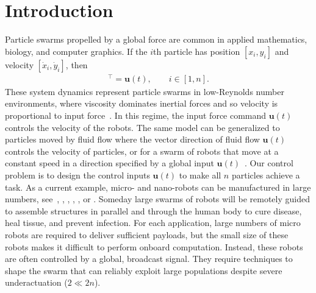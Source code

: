 \section{Introduction}\label{sec:Intro}
Particle swarms propelled by a global force are common in applied mathematics, biology, and computer graphics. 
If the $i$th particle has position $[x_i,y_i]$ and velocity $[\dot{x}_i, \dot{y}_i]$, then
\begin{align}
[\dot{x}_i, \dot{y}_i]^\top = \mathbf{u}(t), \qquad i \in [1,n]. \label{eq:swarmDynamics} %
\end{align}
These system dynamics represent particle swarms in low-Reynolds number environments, where viscosity dominates inertial forces and so velocity is proportional to input force~\citep{Purcell1977}. 
 In this regime, the input force command $\mathbf{u}(t)$ controls the velocity of the robots.  
  The same model can be generalized to particles moved by fluid flow where the vector direction of fluid flow $\mathbf{u}(t)$ controls the velocity of particles, or for a swarm of robots that move at a constant speed in a direction specified by a global input $\mathbf{u}(t)$~\citep{Rubenstein2012}.
 Our control problem is to design the control inputs $\mathbf{u}(t)$ to make all $n$ particles achieve a task.
As a current example, micro- and nano-robots can be manufactured in large numbers, see~\citep{Chowdhury2015}, \citep{martel2014computer}, \citep{kim2015imparting}, \citep{Donald2013}, \citep{Ghosh2009}, \citep{Ou2013} or \citep{qiu2015magnetic}.
Someday large swarms of robots will be remotely guided
to assemble structures in parallel and 
 through the human body to cure disease, heal tissue, and prevent infection. %
 For each application, large numbers of micro robots are required to deliver sufficient payloads, but the small size of these robots makes it difficult to perform onboard computation.  Instead, these robots are often controlled by a global, broadcast signal. 
They require techniques to shape the swarm that can reliably exploit large populations despite severe underactuation ($2 \ll2n$).  
 


